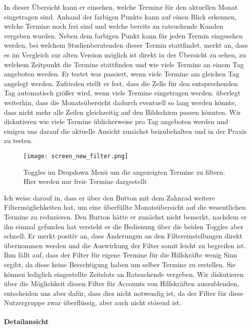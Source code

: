 In dieser Übersicht kann er einsehen, welche Termine für den aktuellen Monat
eingetragen sind. Anhand der farbigen Punkte  kann \ipName auf einen Blick erkennen, welche Termine noch frei sind
und welche bereits an ratsuchende Kunden vergeben wurden. Neben dem farbigen
Punkt kann für jeden Termin eingesehen werden, bei welchem Studienberatenden
dieser Termin stattfindet. \ipName merkt an, dass es im Vergleich zur alten
Version möglich ist direkt in der Übersicht zu sehen, zu welchem Zeitpunkt die
Termine stattfinden und wie viele Termine an einem Tag angeboten werden. Er
testet was passiert, wenn viele Termine am gleichen Tag angelegt werden.
Zufrieden stellt er fest, dass die Zelle für den entsprechenden Tag automatisch
größer wird, wenn viele Termine eingetragen werden. \ipName überlegt weiterhin,
dass die Monatsübersicht dadurch eventuell so lang werden könnte, dass nicht
mehr alle Zeilen gleichzeitig auf den Bildschirm passen könnten. Wir
diskutieren wie viele Termine üblicherweise pro Tag angeboten werden und
einigen uns darauf die aktuelle Ansicht zunächst beizubehalten und in der
Praxis zu testen.

\begin{figure}[H]
    \caption{Toggles im Dropdown Menü um die angezeigten Termine zu filtern. Hier werden nur freie Termine dargestellt}
    \centering
    \texttt{[image: screen\_new\_filter.png]}
\end{figure}

Ich weise \ipName darauf in, dass er über den Button mit dem Zahnrad weitere
Filtermöglichkeiten hat, um eine überfüllte Monatsübersicht auf die
wesentlichen Termine zu reduzieren. Den Button hätte er zunächst nicht bemerkt,
nachdem er ihn einmal gefunden hat versteht er die Bedienung über die beiden
Toggles aber schnell. Er merkt positiv an, dass Änderungen an den
Filtereinstellungen direkt übernommen werden und die Auswirkung der Filter
somit leicht zu begreifen ist. Ihm fällt auf, dass der Filter für eigene
Termine für die Hilfskräfte wenig Sinn ergibt, da diese keine Berechtigung
haben um selber Termine zu erstellen. Sie können lediglich eingestellte
Zeitslots an Ratsuchende vergeben. Wir diskutieren über die Möglichkeit diesen
Filter für Accounts von Hilfskräften auszublenden, entscheiden uns aber dafür,
dass dies nicht notwendig ist, da der Filter für diese Nutzergruppe zwar
überflüssig, aber auch nicht störend ist.

\paragraph{Detailansicht}

